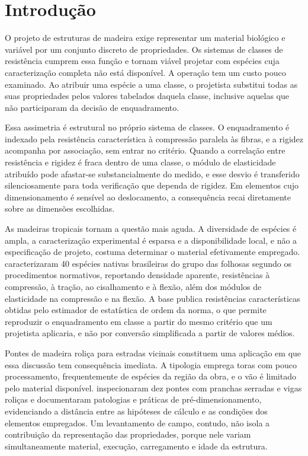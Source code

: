 \section{Introdução}\label{sec:introduction}

O projeto de estruturas de madeira exige representar um material biológico e variável por um conjunto discreto de propriedades. Os sistemas de classes de resistência cumprem essa função e tornam viável projetar com espécies cuja caracterização completa não está disponível. A operação tem um custo pouco examinado. Ao atribuir uma espécie a uma classe, o projetista substitui todas as suas propriedades pelos valores tabelados daquela classe, inclusive aquelas que não participaram da decisão de enquadramento.

Essa assimetria é estrutural no próprio sistema de classes. O enquadramento é indexado pela resistência característica à compressão paralela às fibras, e a rigidez acompanha por associação, sem entrar no critério. Quando a correlação entre resistência e rigidez é fraca dentro de uma classe, o módulo de elasticidade atribuído pode afastar-se substancialmente do medido, e esse desvio é transferido silenciosamente para toda verificação que dependa de rigidez. Em elementos cujo dimensionamento é sensível ao deslocamento, a consequência recai diretamente sobre as dimensões escolhidas.

As madeiras tropicais tornam a questão mais aguda. A diversidade de espécies é ampla, a caracterização experimental é esparsa e a disponibilidade local, e não a especificação de projeto, costuma determinar o material efetivamente empregado. \textcite{DiasLahr2004} caracterizaram 40 espécies nativas brasileiras do grupo das folhosas segundo os procedimentos normativos, reportando densidade aparente, resistências à compressão, à tração, ao cisalhamento e à flexão, além dos módulos de elasticidade na compressão e na flexão. A base publica resistências características obtidas pelo estimador de estatística de ordem da norma, o que permite reproduzir o enquadramento em classe a partir do mesmo critério que um projetista aplicaria, e não por conversão simplificada a partir de valores médios.

Pontes de madeira roliça para estradas vicinais constituem uma aplicação em que essa discussão tem consequência imediata. A tipologia emprega toras com pouco processamento, frequentemente de espécies da região da obra, e o vão é limitado pelo material disponível. \textcite{Criado2024} inspecionaram dez pontes com pranchas serradas e vigas roliças e documentaram patologias e práticas de pré-dimensionamento, evidenciando a distância entre as hipóteses de cálculo e as condições dos elementos empregados. Um levantamento de campo, contudo, não isola a contribuição da representação das propriedades, porque nele variam simultaneamente material, execução, carregamento e idade da estrutura.

